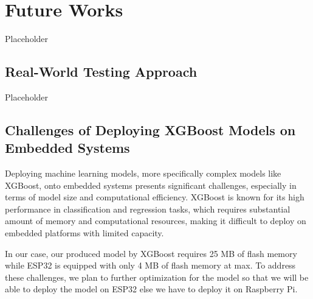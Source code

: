 \documentclass{iutbscthesis}
\begin{document}
\chapter{Future Works} \label{chapter:futureWorks}
Placeholder

\section{Real-World Testing Approach}

Placeholder


\section{Challenges of Deploying XGBoost Models on Embedded Systems}

Deploying machine learning models, more specifically complex models like XGBoost, onto embedded systems presents significant challenges, especially in terms of model size and computational efficiency. XGBoost is known for its high performance in classification and regression tasks, which requires substantial amount of memory and computational resources, making it difficult to deploy on embedded platforms with limited capacity.

In our case, our produced model by XGBoost requires 25 MB of flash memory while ESP32 is equipped with only 4 MB of flash memory at max. To address these challenges, we plan to further optimization for the model so that we will be able to deploy the model on ESP32 else we have to deploy it on Raspberry Pi.











\printbib
\end{document}
